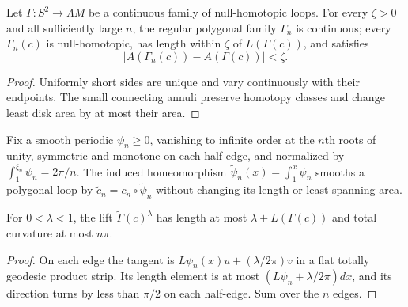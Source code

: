 \begin{corollary}
\label{cor:polygonal-approximation-of-family}
\label{Gammaapprox}
Let $\Gamma\colon S^2\to\Lambda M$ be a continuous family of null-homotopic
loops. For every $\zeta>0$ and all sufficiently large $n$, the regular
polygonal family $\Gamma_n$ is continuous; every $\Gamma_n(c)$ is
null-homotopic, has length within $\zeta$ of $L(\Gamma(c))$, and satisfies
\[
|A(\Gamma_n(c))-A(\Gamma(c))|<\zeta.
\]
\end{corollary}
\begin{proof}

\sketch Uniformly short sides are unique and vary continuously with their endpoints.
The small connecting annuli preserve homotopy classes and change least disk
area by at most their area.
\end{proof}

Fix a smooth periodic $\psi_n\ge0$, vanishing to infinite order at the
$n$th roots of unity, symmetric and monotone on each half-edge, and normalized
by $\int_1^{\xi_n}\psi_n=2\pi/n$. The induced homeomorphism
$\widetilde\psi_n(x)=\int_1^x\psi_n$ smooths a polygonal loop by
$\widetilde c_n=c_n\circ\widetilde\psi_n$ without changing its length or
least spanning area.

\begin{claim}
\label{claim:smoothed-approximation-ramp-bounds}
For $0<\lambda<1$, the lift $\widetilde\Gamma(c)^\lambda$ has length at most
$\lambda+L(\Gamma(c))$ and total curvature at most $n\pi$.
\end{claim}
\begin{proof}
\sketch On each edge the tangent is
$L\psi_n(x)u+(\lambda/2\pi)v$ in a flat totally geodesic product strip. Its
length element is at most $(L\psi_n+\lambda/2\pi)dx$, and its direction turns
by less than $\pi/2$ on each half-edge. Sum over the $n$ edges.
\end{proof}

